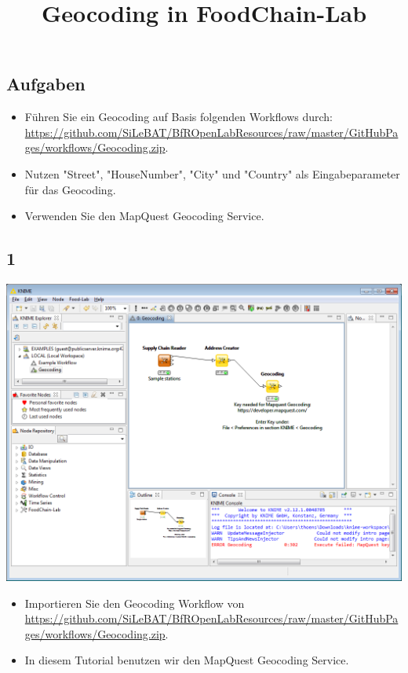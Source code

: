 \documentclass{beamer}
\title{Geocoding in FoodChain-Lab}
\date{}
\begin{document}
\maketitle

\section{ }

\subsection{Aufgaben}
\begin{frame}
	\begin{itemize}
		\item Führen Sie ein Geocoding auf Basis folgenden Workflows durch: \url{https://github.com/SiLeBAT/BfROpenLabResources/raw/master/GitHubPages/workflows/Geocoding.zip}.
		\item Nutzen "Street", "HouseNumber", "City" und "Country" als Eingabeparameter für das Geocoding.
		\item Verwenden Sie den MapQuest Geocoding Service.
	\end{itemize}
\end{frame}
 
\subsection{1}
\begin{frame}
	\begin{center}
  		\includegraphics[height=0.6\textheight]{1.png}
	\end{center}
	\begin{itemize}
		\item Importieren Sie den Geocoding Workflow von \url{https://github.com/SiLeBAT/BfROpenLabResources/raw/master/GitHubPages/workflows/Geocoding.zip}.
		\item In diesem Tutorial benutzen wir den MapQuest Geocoding Service.
	\end{itemize}
\end{frame}
\end{document}
